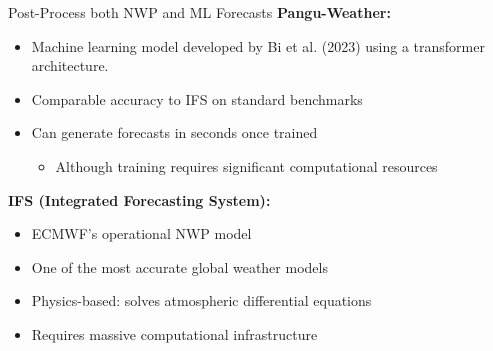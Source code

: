 \documentclass[aspectratio=169, xcolor=dvipsnames]{beamer}
\begin{document}
\begin{frame}{Post-Process both NWP and ML Forecasts}
    \textbf{Pangu-Weather:}
    \begin{itemize}
        \item Machine learning model developed by Bi et al. (2023) using a transformer architecture.
        \item Comparable accuracy to IFS on standard benchmarks
        \item Can generate forecasts in seconds once trained
        \begin{itemize}
            \item Although training requires significant computational resources
        \end{itemize}
    \end{itemize}

    \vspace{0.5cm}
    \textbf{IFS (Integrated Forecasting System):}
    \begin{itemize}
        \item ECMWF's operational NWP model
        \item One of the most accurate global weather models
        \item Physics-based: solves atmospheric differential equations
        \item Requires massive computational infrastructure
    \end{itemize}

\end{frame}
\end{document}
